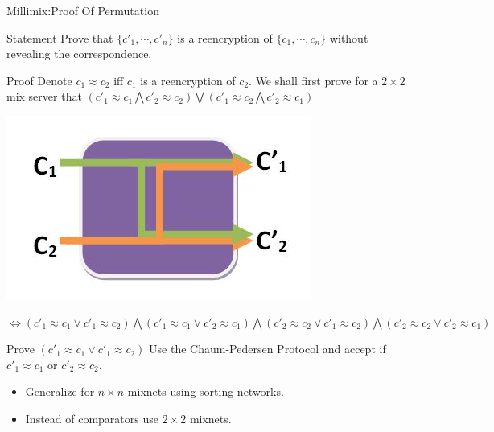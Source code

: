 \documentclass{beamer}
\begin{document}
\begin{frame}[allowframebreaks]{Millimix:Proof Of Permutation}

\begin{block}{Statement}
Prove that $\{c'_1,\cdots,c'_n\}$ is a reencryption of $\{c_1,\cdots,c_n\}$ without revealing the correspondence.
\end{block}

\begin{block}{Proof}
Denote $c_1 \approx c_2$ iff $c_1$ is a reencryption of $c_2$.
We shall first prove for a $2\times2$ mix server that
$(c'_1 \approx c_1 \bigwedge c'_2 \approx c_2) \bigvee (c'_1 \approx c_2 \bigwedge c'_2 \approx c_1)$
\begin{center}
\includegraphics[scale=0.25]{mix2x2.jpg}
\end{center}
\begin{scriptsize}
$\Leftrightarrow (c'_1 \approx c_1 \vee c'_1 \approx c_2) 
  \bigwedge 
 (c'_1 \approx c_1 \vee c'_2 \approx c_1)
  \bigwedge  
 (c'_2 \approx c_2 \vee c'_1 \approx c_2) 
  \bigwedge 
 (c'_2 \approx c_2 \vee c'_2 \approx c_1)  
$
\end{scriptsize}
\end{block}

\begin{block}{Prove  $(c'_1 \approx c_1 \vee c'_1 \approx c_2)$}
Use the Chaum-Pedersen Protocol and accept if $c'_1 \approx c_1$ or $c'_2 \approx c_2$.
\end{block}
\begin{itemize}
\item Generalize for $n \times n$ mixnets using sorting networks.
\item Instead of comparators use $2 \times 2$ mixnets.
\end{itemize}
\end{frame}
\end{document}
